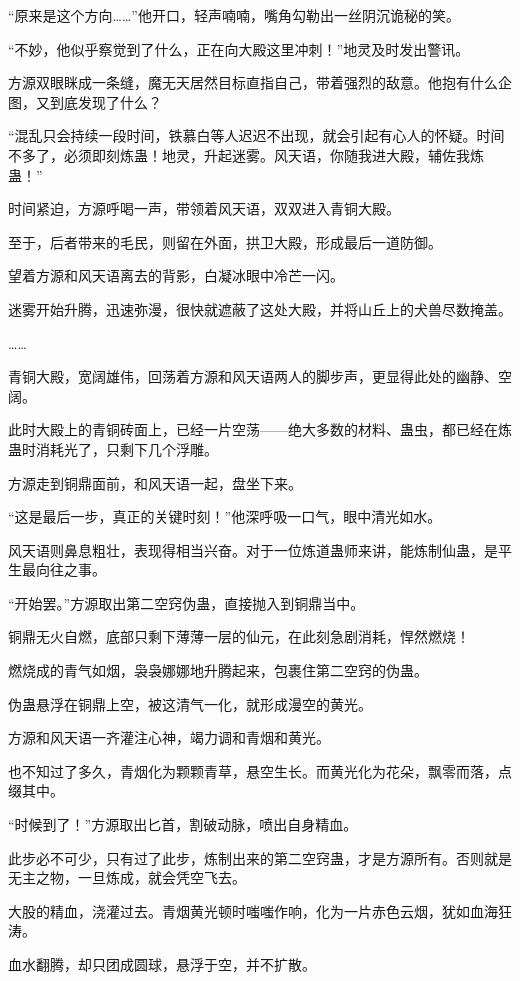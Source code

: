 \begin{this_body}
“原来是这个方向……”他开口，轻声喃喃，嘴角勾勒出一丝阴沉诡秘的笑。

“不妙，他似乎察觉到了什么，正在向大殿这里冲刺！”地灵及时发出警讯。

方源双眼眯成一条缝，魔无天居然目标直指自己，带着强烈的敌意。他抱有什么企图，又到底发现了什么？

“混乱只会持续一段时间，铁慕白等人迟迟不出现，就会引起有心人的怀疑。时间不多了，必须即刻炼蛊！地灵，升起迷雾。风天语，你随我进大殿，辅佐我炼蛊！”

时间紧迫，方源呼喝一声，带领着风天语，双双进入青铜大殿。

至于，后者带来的毛民，则留在外面，拱卫大殿，形成最后一道防御。

望着方源和风天语离去的背影，白凝冰眼中冷芒一闪。

迷雾开始升腾，迅速弥漫，很快就遮蔽了这处大殿，并将山丘上的犬兽尽数掩盖。

……

青铜大殿，宽阔雄伟，回荡着方源和风天语两人的脚步声，更显得此处的幽静、空阔。

此时大殿上的青铜砖面上，已经一片空荡——绝大多数的材料、蛊虫，都已经在炼蛊时消耗光了，只剩下几个浮雕。

方源走到铜鼎面前，和风天语一起，盘坐下来。

“这是最后一步，真正的关键时刻！”他深呼吸一口气，眼中清光如水。

风天语则鼻息粗壮，表现得相当兴奋。对于一位炼道蛊师来讲，能炼制仙蛊，是平生最向往之事。

“开始罢。”方源取出第二空窍伪蛊，直接抛入到铜鼎当中。

铜鼎无火自燃，底部只剩下薄薄一层的仙元，在此刻急剧消耗，悍然燃烧！

燃烧成的青气如烟，袅袅娜娜地升腾起来，包裹住第二空窍的伪蛊。

伪蛊悬浮在铜鼎上空，被这清气一化，就形成漫空的黄光。

方源和风天语一齐灌注心神，竭力调和青烟和黄光。

也不知过了多久，青烟化为颗颗青草，悬空生长。而黄光化为花朵，飘零而落，点缀其中。

“时候到了！”方源取出匕首，割破动脉，喷出自身精血。

此步必不可少，只有过了此步，炼制出来的第二空窍蛊，才是方源所有。否则就是无主之物，一旦炼成，就会凭空飞去。

大股的精血，浇灌过去。青烟黄光顿时嗤嗤作响，化为一片赤色云烟，犹如血海狂涛。

血水翻腾，却只团成圆球，悬浮于空，并不扩散。


\end{this_body}
